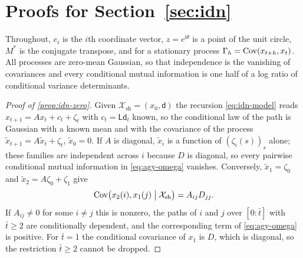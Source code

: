 \section{Proofs for \texorpdfstring{Section~\ref{sec:idn}}{unrecorded drivers}}\label{app:idn}

Throughout, $e_i$ is the $i$th coordinate vector, $z=e^{\mathrm i\theta}$ is a point of the unit circle, $M^*$ is the conjugate transpose, and for a stationary process $\Gamma_h=\operatorname{Cov}(x_{t+h},x_t)$. All processes are zero-mean Gaussian, so that independence is the vanishing of covariances and every conditional mutual information is one half of a log ratio of conditional variance determinants.

\begin{proof}[Proof of \cref{prop:idn-zero}]
Given $\mathcal X_{\mathrm{sh}}=(x_0,\mathsf d)$ the recursion \cref{eq:idn-model} reads $x_{t+1}=Ax_t+c_t+\zeta_t$ with $c_t=\mathsf L\mathsf d_t$ known, so the conditional law of the path is Gaussian with a known mean and with the covariance of the process $\tilde x_{t+1}=A\tilde x_t+\zeta_t$, $\tilde x_0=0$. If $A$ is diagonal, $\tilde x_i$ is a function of $(\zeta_i(s))_s$ alone; these families are independent across $i$ because $D$ is diagonal, so every pairwise conditional mutual information in \cref{eq:agy-omega} vanishes. Conversely, $\tilde x_1=\zeta_0$ and $\tilde x_2=A\zeta_0+\zeta_1$ give
\begin{equation}\label{eq:idn-lagcov}
\operatorname{Cov}\bigl(x_2(i),x_1(j)\bigm|\mathcal X_{\mathrm{sh}}\bigr)=A_{ij}D_{jj}.
\end{equation}
If $A_{ij}\neq0$ for some $i\neq j$ this is nonzero, the paths of $i$ and $j$ over $[0{:}\bar t]$ with $\bar t\ge2$ are conditionally dependent, and the corresponding term of \cref{eq:agy-omega} is positive. For $\bar t=1$ the conditional covariance of $x_1$ is $D$, which is diagonal, so the restriction $\bar t\ge2$ cannot be dropped.
\end{proof}


